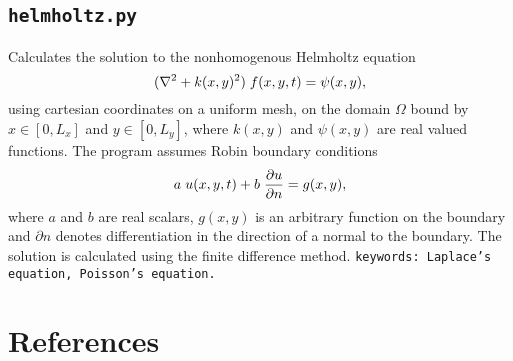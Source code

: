 \documentclass{article}
\begin{document}
\subsection{\texttt{helmholtz.py}} 
Calculates the solution to the nonhomogenous Helmholtz equation
\begin{equation*}
(\nabla^2 + k(x,y)^2) \hspace{0.1cm} f(x,y,t) = \psi(x,y),
\end{equation*}
using cartesian coordinates on a uniform mesh, on the domain $\Omega$ bound by \newline $x \in [0,L_x]$ and $y \in [0,L_y]$, where $k(x,y)$ and $\psi(x,y)$ are real valued functions. The program assumes Robin boundary conditions
\begin{equation*}
a \hspace{0.1cm} u(x,y,t) + b \hspace{0.1cm} \frac{\partial u}{\partial n} = g(x,y),
\end{equation*}
where $a$ and $b$ are real scalars, $g(x,y)$ is an arbitrary function on the boundary and $\partial n$ denotes differentiation in the direction of a normal to the boundary. The solution is calculated using the finite difference method. \newline
\newline
\texttt{keywords: Laplace's equation, Poisson's equation.}

\section{References}
\printbibliography[title={Articles},type=article,sorting=nyt,heading=subbibliography]
\end{document}
